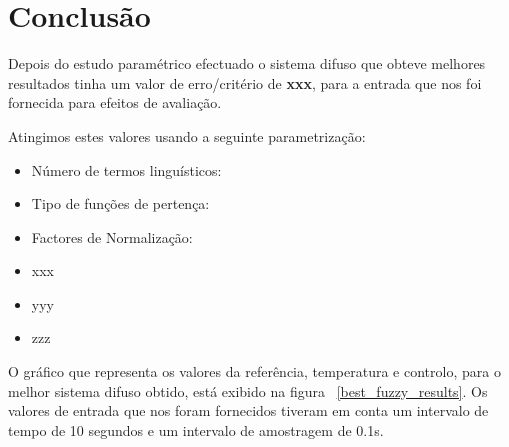 \documentclass{article}
\begin{document}
\clearpage
\section{Conclusão}
\indent \indent Depois do estudo paramétrico efectuado o sistema difuso que obteve melhores resultados tinha um valor de erro/critério de \textbf{xxx}, para a entrada que nos foi fornecida para efeitos de avaliação.

Atingimos estes valores usando a seguinte parametrização:
\begin{itemize}
\item Número de termos linguísticos:
\item Tipo de funções de pertença:
\item Factores de Normalização:
\item xxx
\item yyy
\item zzz
\end{itemize}

O gráfico que representa os valores da referência, temperatura e controlo, para o melhor sistema difuso obtido, está exibido na figura ~\ref{best_fuzzy_results}. Os valores de entrada que nos foram fornecidos tiveram em conta um intervalo de tempo de 10 segundos e um intervalo de amostragem de 0.1s.
\end{document}
